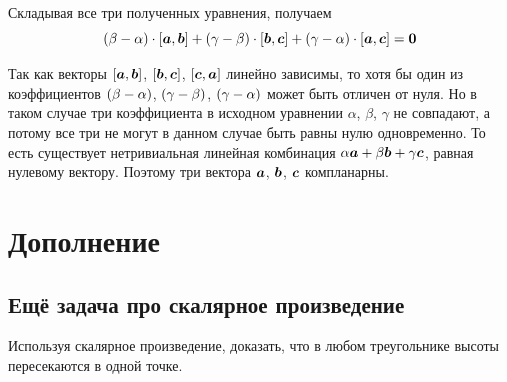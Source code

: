 \documentclass[a4paper,12pt]{article}
\begin{document}
\begin{solution}
    Складывая все три полученных уравнения, получаем
    \[
      (\beta - \alpha) \cdot [\boldsymbol a, \boldsymbol b] + (\gamma - \beta) \cdot [\boldsymbol b, \boldsymbol c] + (\gamma - \alpha) \cdot [\boldsymbol a, \boldsymbol c] = \boldsymbol 0
    \]
    
    Так как векторы $[\boldsymbol a, \boldsymbol b]$, $[\boldsymbol b, \boldsymbol c]$, $[\boldsymbol c, \boldsymbol a]$ линейно зависимы, то хотя бы один из коэффициентов $(\beta \hm- \alpha)$, $(\gamma \hm- \beta)$, $(\gamma \hm- \alpha)$ может быть отличен от нуля.
    Но в таком случае три коэффициента в исходном уравнении $\alpha$, $\beta$, $\gamma$ не совпадают, а потому все три не могут в данном случае быть равны нулю одновременно.
    То есть существует нетривиальная линейная комбинация $\alpha \bds a \hm+ \beta \bds b \hm+ \gamma \bds c$, равная нулевому вектору.
    Поэтому три вектора $\boldsymbol a$, $\boldsymbol b$, $\boldsymbol c$ компланарны.
  \end{solution}
  
  
  
  
  \section{Дополнение}
  
  \subsection{Ещё задача про скалярное произведение}
  
  \begin{problem}
    Используя скалярное произведение, доказать, что в любом треугольнике высоты пересекаются в одной точке.
  \end{problem}
  
\end{document}
